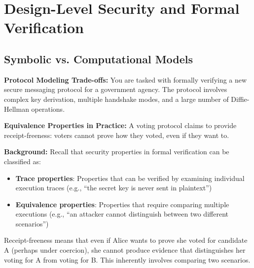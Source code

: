 \documentclass[10pt,a4paper,american]{exam}
\begin{document}
\section{Design-Level Security and Formal Verification}
\begin{questions}
	\subsection*{Symbolic vs. Computational Models}

	\question[10] \textbf{Protocol Modeling Trade-offs:}
	You are tasked with formally verifying a new secure messaging protocol for a government agency. The protocol involves complex key derivation, multiple handshake modes, and a large number of Diffie-Hellman operations.

	\question[10] \textbf{Equivalence Properties in Practice:}
	A voting protocol claims to provide receipt-freeness: voters cannot prove how they voted, even if they want to.

	\textbf{Background:} Recall that security properties in formal verification can be classified as:
	\begin{itemize}
		\item \textbf{Trace properties}: Properties that can be verified by examining individual execution traces (e.g., ``the secret key is never sent in plaintext'')
		\item \textbf{Equivalence properties}: Properties that require comparing multiple executions (e.g., ``an attacker cannot distinguish between two different scenarios'')
	\end{itemize}

	Receipt-freeness means that even if Alice wants to prove she voted for candidate A (perhaps under coercion), she cannot produce evidence that distinguishes her voting for A from voting for B. This inherently involves comparing two scenarios.


\end{questions}
\end{document}
